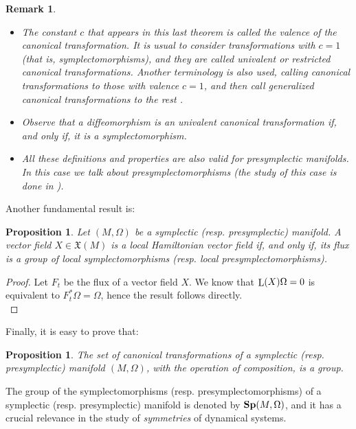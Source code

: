 \documentclass[12pt]{report}
\newtheorem{prop}[teor]{Proposition}
\newtheorem{remark}[teor]{Remark}
\def\qed{\ifvmode\removelastskip\fi
{\unskip\nobreak\hfil\penalty50\hbox{}\nobreak\hfil
\hbox{\vrule height1.2ex width1.2ex}\parfillskip=0pt
\finalhyphendemerits=0 \par\smallskip}}
\def\vf{\mathfrak X}
\def\Lie{\mathop{\rm L}\nolimits}
\begin{document}
\begin{remark}{\rm 
\begin{itemize}
\item
The constant $c$ that appears in this last theorem
is called  the {\sl valence} of the canonical transformation.
It is usual to consider transformations with $c=1$
(that is, symplectomorphisms),
and they are called {\sl univalent {\rm or} restricted canonical transformations}.
Another terminology is also used, calling canonical transformations
to those with valence $c=1$, and then call 
{\sl generalized canonical transformations} to the rest \cite{SC-71}.
\item
Observe that a diffeomorphism is an {\sl univalent canonical transformation}
if, and only if, it is a {\sl  symplectomorphism}.
\item
All these definitions and properties are also valid for
presymplectic manifolds. In this case we talk about
{\sl presymplectomorphisms}
(the study of this case is done in \cite{BGPR-86,CGIR-85,CGIR-87}).
\end{itemize}
}\end{remark}

Another fundamental result is:

\begin{prop}
Let $(M,\Omega )$ be a symplectic (resp. presymplectic) manifold.
A vector field $X \in\vf(M)$ is a local Hamiltonian vector field
if, and only if, its flux is a group of 
local symplectomorphisms (resp. local presymplectomorphisms).
\end{prop}
\begin{proof} Let $F_t$ be the flux of a vector field $X$. We know that $
\Lie (X)\Omega = 0$ is equivalent to $F_t^*\Omega = \Omega$, hence the result follows directly.
\\ \qed  \end{proof}

Finally, it is easy to prove that:

\begin{prop}
The set of canonical transformations  of a symplectic (resp. presymplectic) manifold
$(M,\Omega)$, with the operation of composition, is a group.
\end{prop}

The group of the symplectomorphisms
(resp. presymplectomorphisms)
of a symplectic (resp. presymplectic) manifold is denoted by ${\bf Sp}(M,\Omega )$,
and it has a crucial relevance in the study of {\sl  symmetries} of dynamical systems.
\end{document}
